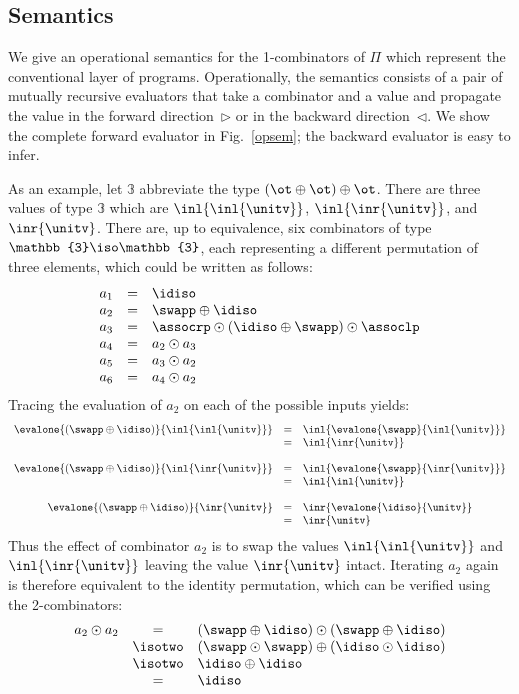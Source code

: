 \subsection{Semantics}
\label{sec:pisem}

We give an operational semantics for the 1-combinators of $\Pi$ which
represent the conventional layer of programs.  Operationally, the
semantics consists of a pair of mutually recursive evaluators that
take a combinator and a value and propagate the value in the forward
direction~$\triangleright$ or in the backward
direction~$\triangleleft$. We show the complete forward evaluator in
Fig.~\ref{opsem}; the backward evaluator is easy to infer.

As an example, let $\mathbb{3}$ abbreviate the type
$(\ot \oplus \ot) \oplus \ot$. There are three values of type
$\mathbb{3}$ which are $\inl{\inl{\unitv}}$, $\inl{\inr{\unitv}}$, and
$\inr{\unitv}$. There are, up to equivalence, six combinators of type
$\mathbb{3} \iso \mathbb{3}$, each representing a different
permutation of three elements, which could be written as follows:
\[\begin{array}{rcl}
a_1 &=& \idiso \\
a_2 &=& \swapp \oplus \idiso \\
a_3 &=& \assocrp \odot (\idiso \oplus \swapp) \odot \assoclp \\
a_4 &=& a_2 \odot a_3 \\
a_5 &=& a_3 \odot a_2 \\
a_6 &=& a_4 \odot a_2
\end{array}\]
Tracing the evaluation of $a_2$ on each of the possible inputs yields:
\[\begin{array}{rcl}
\evalone{(\swapp\oplus\idiso)}{\inl{\inl{\unitv}}} &=& \inl{\evalone{\swapp}{\inl{\unitv}}} \\
&=& \inl{\inr{\unitv}} \\
\\
\evalone{(\swapp\oplus\idiso)}{\inl{\inr{\unitv}}} &=& \inl{\evalone{\swapp}{\inr{\unitv}}} \\
&=& \inl{\inl{\unitv}} \\
\\
\evalone{(\swapp\oplus\idiso)}{\inr{\unitv}} &=& \inr{\evalone{\idiso}{\unitv}} \\
&=& \inr{\unitv}
\end{array}\]
Thus the effect of combinator $a_2$ is to swap the values
$\inl{\inl{\unitv}}$ and $\inl{\inr{\unitv}}$ leaving the value
$\inr{\unitv}$ intact. Iterating $a_2$ again is therefore equivalent
to the identity permutation, which can be verified using the
2-combinators:
\[\begin{array}{rcl}
a_2 \odot a_2 &=& (\swapp \oplus \idiso) \odot (\swapp \oplus \idiso) \\
&\isotwo& (\swapp \odot \swapp) \oplus (\idiso \odot \idiso) \\
&\isotwo& \idiso \oplus \idiso \\
&=& \idiso
\end{array}\]

